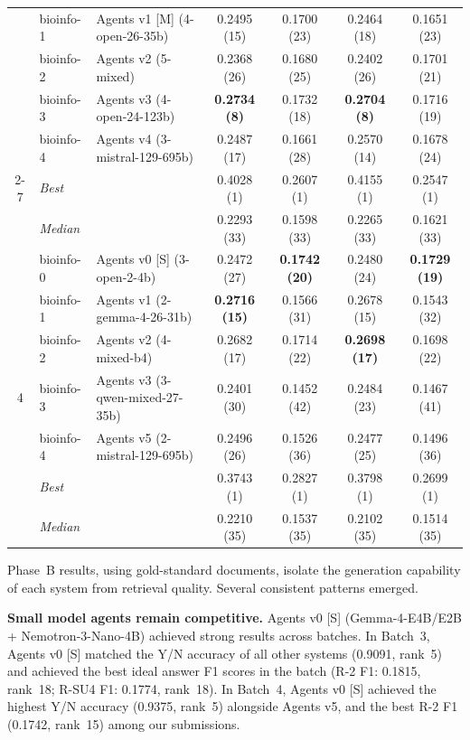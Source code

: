 \begin{table}[ht]
\begin{tabular}{cl|p{5.5cm}|cccc}
    & bioinfo-1 & Agents v1 [M] (4-open-26-35b) & 0.2495 (15) & 0.1700 (23) & 0.2464 (18) & 0.1651 (23) \\
    & bioinfo-2 & Agents v2 (5-mixed) & 0.2368 (26) & 0.1680 (25) & 0.2402 (26) & 0.1701 (21) \\
    & bioinfo-3 & Agents v3 (4-open-24-123b) & \textbf{0.2734 (8)} & 0.1732 (18) & \textbf{0.2704 (8)} & 0.1716 (19) \\
    & bioinfo-4 & Agents v4 (3-mistral-129-695b) & 0.2487 (17) & 0.1661 (28) & 0.2570 (14) & 0.1678 (24) \\
    \cmidrule(l){2-7}
    & \textit{Best} & \multicolumn{1}{l|}{} & 0.4028 (1) & 0.2607 (1) & 0.4155 (1) & 0.2547 (1) \\
    & \textit{Median}& \multicolumn{1}{l|}{} & 0.2293 (33) & 0.1598 (33) & 0.2265 (33) & 0.1621 (33) \\
    \midrule
    \multirow{7}{*}{4}
    & bioinfo-0 & Agents v0 [S] (3-open-2-4b) & 0.2472 (27) & \textbf{0.1742 (20)} & 0.2480 (24) & \textbf{0.1729 (19)} \\
    & bioinfo-1 & Agents v1 (2-gemma-4-26-31b) & \textbf{0.2716 (15)} & 0.1566 (31) & 0.2678 (15) & 0.1543 (32) \\
    & bioinfo-2 & Agents v2 (4-mixed-b4) & 0.2682 (17) & 0.1714 (22) & \textbf{0.2698 (17)} & 0.1698 (22) \\
    & bioinfo-3 & Agents v3 (3-qwen-mixed-27-35b) & 0.2401 (30) & 0.1452 (42) & 0.2484 (23) & 0.1467 (41) \\
    & bioinfo-4 & Agents v5 (2-mistral-129-695b) & 0.2496 (26) & 0.1526 (36) & 0.2477 (25) & 0.1496 (36) \\
    \cmidrule(l){2-7}
    & \textit{Best} & \multicolumn{1}{l|}{} & 0.3743 (1) & 0.2827 (1) & 0.3798 (1) & 0.2699 (1) \\
    & \textit{Median}& \multicolumn{1}{l|}{} & 0.2210 (35) & 0.1537 (35) & 0.2102 (35) & 0.1514 (35) \\
    \bottomrule
  \end{tabular}
\end{table}

Phase~B results, using gold-standard documents, isolate the generation capability of each system from retrieval quality. Several consistent patterns emerged.

\textbf{Small model agents remain competitive.} Agents v0 [S] (Gemma-4-E4B/E2B + Nemotron-3-Nano-4B) achieved strong results across batches. In Batch~3, Agents v0 [S] matched the Y/N accuracy of all other systems (0.9091, rank~5) and achieved the best ideal answer F1 scores in the batch (R-2 F1: 0.1815, rank~18; R-SU4 F1: 0.1774, rank~18). In Batch~4, Agents v0 [S] achieved the highest Y/N accuracy (0.9375, rank~5) alongside Agents v5, and the best R-2 F1 (0.1742, rank~15) among our submissions.

